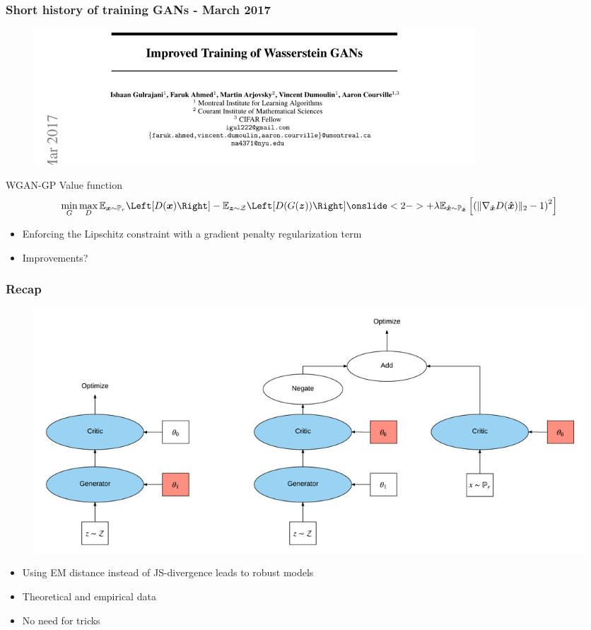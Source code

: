 \documentclass{Bredelebeamer}
\begin{document}
\begin{frame}
	\frametitle{Short history of training GANs - March 2017}
	\begin{figure}[h!]
		\centering
		\includegraphics[width=0.8\textwidth]{wgan_gp_paper.png}
	\end{figure}
	\begin{exampleblock}{WGAN-GP Value function}
	\begin{gather*}
		\min_G \max_{D}
		\mathbb{E}_{\bm{x} \sim \mathbb{P}_r} \Left[ D(\bm{x}) \Right]
		- \mathbb{E}_{\bm{z} \sim \mathcal{Z}} \Left[ D(G(\bm{z}))  \Right] 
		\onslide<2->{+ \lambda \mathbb{E}_{\bm{\hat{x}} \sim \mathbb{P}_{\bm{\hat{x}}}} \left[ \left( \Vert \nabla_{\bm{\hat{x}}} D(\bm{\hat{x}}) \Vert_2  - 1 \right)^2  \right]}
	\end{gather*}
	\end{exampleblock}
	\begin{itemize}[<+(1)->]
		\item Enforcing the Lipschitz constraint with a gradient penalty regularization term
		\item Improvements?
	\end{itemize}
\end{frame}


\begin{frame}
	\frametitle{Recap}
	\begin{figure}[h!]
	\centering
	\includegraphics[width=\textwidth]{GAN_optimization_two_step.png}
	\end{figure}
	\begin{itemize}
		\item Using EM distance instead of JS-divergence leads to robust models
		\item Theoretical and empirical data
		\item No need for tricks 
	\end{itemize}
\end{frame}
\end{document}
